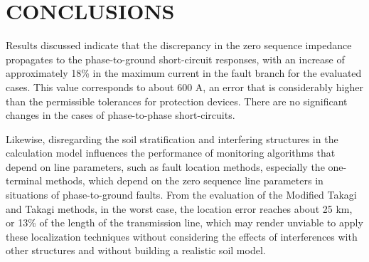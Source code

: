 \documentclass[conference]{IEEEtran}
\begin{document}
	\section{CONCLUSIONS}
	
	Results discussed indicate that the discrepancy in the zero sequence impedance propagates to the phase-to-ground short-circuit responses, with an increase of approximately 18\% in the maximum current in the fault branch for the evaluated cases. This value corresponds to about 600 A, an error that is considerably higher than the permissible tolerances for protection devices. There are no significant changes in the cases of phase-to-phase short-circuits.
	
	Likewise, disregarding the soil stratification and interfering structures in the calculation model influences the performance of monitoring algorithms that depend on line parameters, such as fault location methods, especially the one-terminal methods, which depend on the zero sequence line parameters in situations of phase-to-ground faults. From the evaluation of the Modified Takagi and Takagi methods, in the worst case, the location error reaches about 25 km, or 13\% of the length of the transmission line, which may render unviable to apply these localization techniques without considering the effects of interferences with other structures and without building a realistic soil model.
	
	
	
	\nocite{*}
	
	
	
\end{document}
